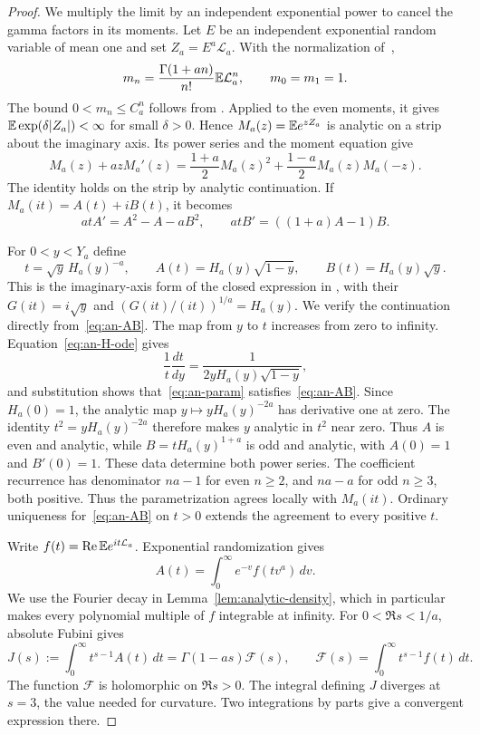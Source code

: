 \begin{proof}
We multiply the limit by an independent exponential power to cancel
the gamma factors in its moments.
Let $E$ be an independent exponential random variable of mean one
and set $Z_a=E^a\mathcal L_a$. With the normalization of~\cite{glrs2025},
\[
 m_n=\frac{\Gamma(1+an)}{n!}\mathbb{E} \mathcal L_a^n,
 \qquad m_0=m_1=1.
\]
The bound $0<m_n\le C_a^n$ follows from
\cite[Lemma~2.10 and Corollary~2.14]{glr2026}. Applied to
the even moments, it gives $\mathbb{E}\exp(\delta|Z_a|)<\infty$ for small
$\delta>0$. Hence $M_a(z)=\mathbb{E} e^{zZ_a}$ is analytic on a strip
about the imaginary axis. Its power series and the moment equation give
\begin{equation}\label{eq:an-moment-ode}
 M_a(z)+azM_a'(z)
 =\frac{1+a}{2}M_a(z)^2
  +\frac{1-a}{2}M_a(z)M_a(-z).
\end{equation}
The identity holds on the strip by analytic continuation.
If $M_a(it)=A(t)+iB(t)$, it becomes
\begin{equation}\label{eq:an-AB}
 atA'=A^2-A-aB^2,\qquad
 atB'=((1+a)A-1)B.
\end{equation}

For $0<y<Y_a$ define
\begin{equation}\label{eq:an-param}
 t=\sqrt y\,H_a(y)^{-a},\qquad
 A(t)=H_a(y)\sqrt{1-y},\qquad B(t)=H_a(y)\sqrt y.
\end{equation}
This is the imaginary-axis form of the closed expression in
\cite[Proposition~3.2]{glrs2025}, with their $G(it)=i\sqrt y$
and $(G(it)/(it))^{1/a}=H_a(y)$. We verify the continuation
directly from~\eqref{eq:an-AB}.
The map from $y$ to $t$ increases from zero to infinity.
Equation~\eqref{eq:an-H-ode} gives
\[
 \frac{1}{t}\frac{dt}{dy}
 =\frac{1}{2yH_a(y)\sqrt{1-y}},
\]
and substitution shows that~\eqref{eq:an-param} satisfies~\eqref{eq:an-AB}.
Since $H_a(0)=1$, the analytic map $y\mapsto yH_a(y)^{-2a}$
has derivative one at zero. The identity $t^2=yH_a(y)^{-2a}$
therefore makes $y$ analytic in $t^2$ near zero.
Thus $A$ is even and analytic, while $B=tH_a(y)^{1+a}$ is odd
and analytic, with $A(0)=1$ and $B'(0)=1$.
These data determine both power series. The coefficient
recurrence has denominator $na-1$ for even $n\ge2$, and $na-a$
for odd $n\ge3$, both positive. Thus the parametrization agrees locally with
$M_a(it)$. Ordinary uniqueness for~\eqref{eq:an-AB} on $t>0$
extends the agreement to every positive $t$.

Write $f(t)=\operatorname{Re}\mathbb{E} e^{it\mathcal L_a}$. Exponential randomization gives
\[
 A(t)=\int_0^\infty e^{-v}f(tv^a)\,d v.
\]
We use the Fourier decay in Lemma~\ref{lem:analytic-density},
which in particular makes every polynomial multiple of $f$
integrable at infinity. For $0<\Re s<1/a$, absolute Fubini gives
\begin{equation}\label{eq:an-mellin}
 J(s):=\int_0^\infty t^{s-1}A(t)\,d t
 =\Gamma(1-as)\mathcal F(s),\qquad
 \mathcal F(s)=\int_0^\infty t^{s-1}f(t)\,d t.
\end{equation}
The function $\mathcal F$ is holomorphic on $\Re s>0$.
The integral defining $J$ diverges at $s=3$, the value needed for curvature.
Two integrations by parts give a convergent expression there.


\end{proof}
